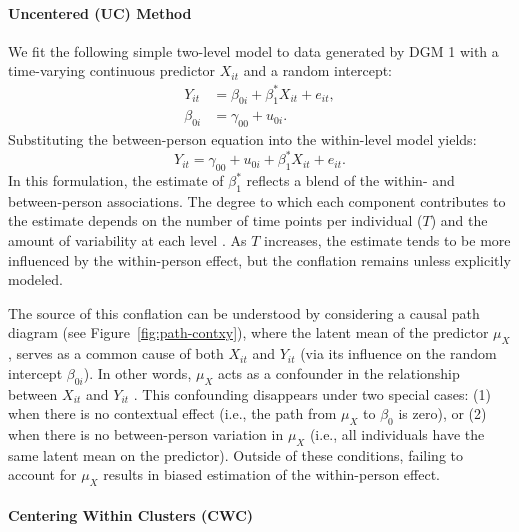 \documentclass[stu]{apa7}
\begin{document}
\paragraph{Uncentered (UC) Method}

We fit the following simple two-level model to data generated by DGM 1 with a time-varying continuous predictor \( X_{it} \) and a random intercept:
\begin{align}
\label{eqn:method-M1-linear-within}
Y_{it} &= \beta_{0i} + \beta_1^* X_{it} + e_{it}, \\
\label{eqn:method-M1-linear-between}
\beta_{0i} &= \gamma_{00} + u_{0i}.
\end{align}
Substituting the between-person equation into the within-level model yields:
\begin{equation}
\label{eqn:method-M1-linear}
Y_{it} = \gamma_{00} + u_{0i} + \beta_1^* X_{it} + e_{it}.
\end{equation}
In this formulation, the estimate of \( \beta_1^* \) reflects a blend of the within- and between-person associations. The degree to which each component contributes to the estimate depends on the number of time points per individual (\( T \)) and the amount of variability at each level \parencite{mundlak_pooling_1978, raudenbush_hierarchical_2002, neuhaus_between-_1998}. As \( T \) increases, the estimate tends to be more influenced by the within-person effect, but the conflation remains unless explicitly modeled.

The source of this conflation can be understood by considering a causal path diagram (see Figure~\ref{fig:path-contxy}), where the latent mean of the predictor \( \mu_X  \), serves as a common cause of both \( X_{it} \) and \( Y_{it} \) (via its influence on the random intercept \( \beta_{0i} \)). In other words, \( \mu_X \) acts as a confounder in the relationship between \( X_{it} \) and \( Y_{it} \) \parencite[e.g.,][]{berlin_empirical_1999}. This confounding disappears under two special cases: (1) when there is no contextual effect (i.e., the path from \( \mu_X \) to $\beta_0$ is zero), or (2) when there is no between-person variation in \( \mu_X \) (i.e., all individuals have the same latent mean on the predictor). Outside of these conditions, failing to account for \( \mu_X \) results in biased estimation of the within-person effect.

\paragraph{Centering Within Clusters (CWC)}
\end{document}
